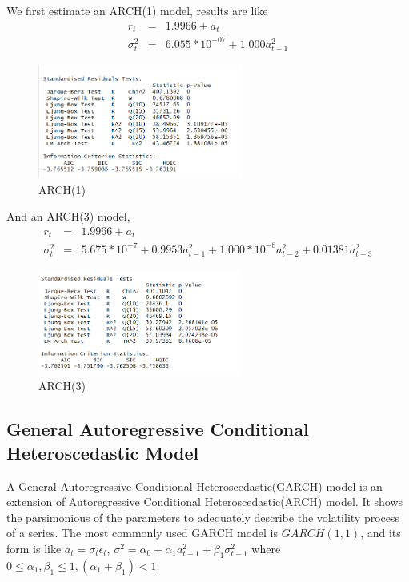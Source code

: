 \documentclass[12pt, a4paper, titlepage]{article}
\begin{document}
We first estimate an ARCH(1) model, results are like
\begin{eqnarray*}
r_t &=& 1.9966 + a_t\\
\sigma_t^2 &=& 6.055*10^{-07} + 1.000 a_{t-1}^2 
\end{eqnarray*}
\begin{figure}[h!]
\begin{center}
\caption{ARCH(1)}\label{ARCH(1)}
\includegraphics[width=0.6\textwidth]{arch1a.png} 
\end{center}
\end{figure}

And an ARCH(3) model,
\begin{eqnarray*}
r_t &=& 1.9966 + a_t\\
\sigma_t^2 &=& 5.675*10^{-7} + 0.9953 a_{t-1}^2 + 1.000*10^{-8} a_{t-2}^2 +0.01381 a_{t-3}^2
\end{eqnarray*}
\begin{figure}[h!]
\begin{center}
\caption{ARCH(3)}\label{ARCH(3)}
\includegraphics[width=0.6\textwidth]{arch3a.png} 
\end{center}
\end{figure}


\subsection{General Autoregressive Conditional Heteroscedastic Model}
A General Autoregressive Conditional Heteroscedastic(GARCH) model is an extension of Autoregressive Conditional Heteroscedastic(ARCH) model. It shows the parsimonious of the parameters to adequately describe the volatility process of a series. The most commonly used GARCH model is $GARCH(1,1)$, and its form is like $a_t = \sigma_t \epsilon_t$, $\sigma^2 = \alpha_0 + \alpha_1 a_{t-1}^2 + \beta_1 \sigma_{t-1}^2$ where $0 \leq \alpha_1, \beta_1 \leq 1, (\alpha_1 + \beta_1) <1$.\\ 
\end{document}
